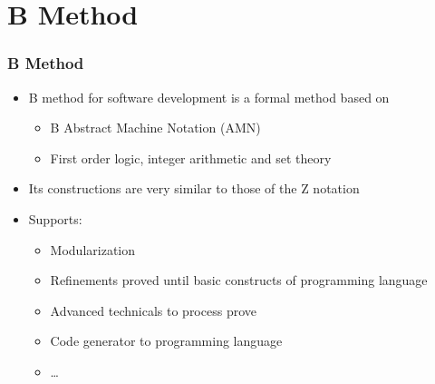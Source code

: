 \section{B Method}

\begin{frame}
\hypertarget{metodoB}{}
  \frametitle{B Method} 
  \begin{itemize}
    \item B method for software development is a formal method based on
	    \begin{itemize}
	    \item  B Abstract Machine Notation (AMN)
	    \item  First order logic, integer arithmetic and set theory
	    \end{itemize}
    \item Its constructions are very similar to those of the Z notation    
    \item Supports:
    \begin{itemize}
	    \item Modularization
	    \item Refinements proved until basic constructs of programming language 
	    \item Advanced technicals to process prove 
	    \item Code generator to programming language
	    \item \ldots
    \end{itemize}   
  \end{itemize}
\end{frame}
    
    
    
